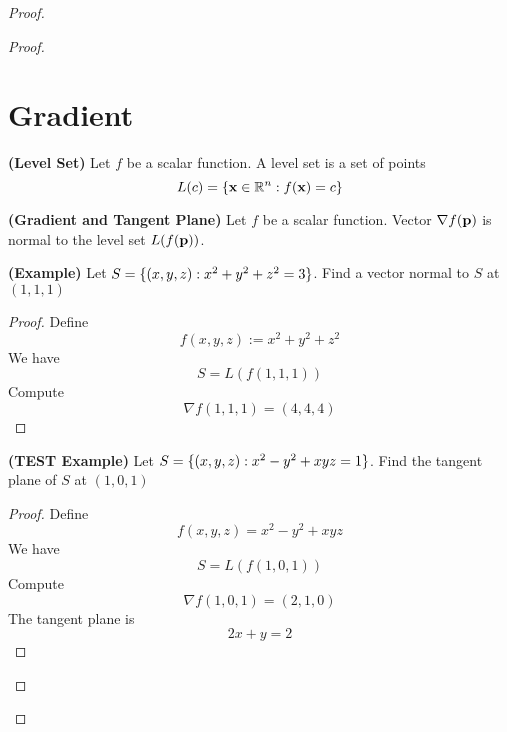 \documentclass{report}
\begin{document}
\begin{proof}
\begin{proof}
\section{Gradient}
\begin{definition}
\label{5.5.1}
\textbf{(Level Set)} Let $f$ be a scalar function. A level set is a set of points
\begin{equation}
L(c)=\{ \textbf{x}\in\mathbb{R}^n: f(\textbf{x})=c \}
\end{equation}
\end{definition}
\begin{theorem}
\label{5.5.2}
\textbf{(Gradient and Tangent Plane)} Let $f$ be a scalar function. Vector $\nabla f(\textbf{p})$ is normal to the level set $L(f(\textbf{p}))$. 
\end{theorem}
\begin{theorem}
\label{5.5.3}
\textbf{(Example)} Let $S=\{ (x,y,z):x^2+y^2+z^2=3 \}$. Find a vector normal to $S$ at  $(1,1,1)$
\end{theorem}
\begin{proof}
Define
\begin{equation}
f(x,y,z):=x^2+y^2+z^2 
\end{equation}
We have
\begin{equation}
S=L(f(1,1,1))
\end{equation}
Compute
\begin{equation}
\nabla f(1,1,1)=(4,4,4)
\end{equation}
\end{proof}
\begin{theorem}
\label{5.5.4}
\textbf{(TEST Example)} Let $S=\{ (x,y,z):x^2-y^2+xyz=1 \}$. Find the tangent plane of $S$ at $(1,0,1)$ 
\end{theorem}
\begin{proof}
Define
\begin{equation}
f(x,y,z)=x^2-y^2+xyz
\end{equation}
We have
\begin{equation}
S=L(f(1,0,1))
\end{equation}
Compute
\begin{equation}
\nabla f(1,0,1)=(2,1,0)
\end{equation}
The tangent plane is 
\begin{equation}
2x+y=2
\end{equation}
\end{proof}

\end{proof}
\end{proof}
\end{document}
